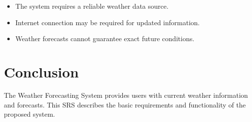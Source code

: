 \documentclass[12pt,a4paper]{article}
\begin{document}
\begin{itemize}
\item The system requires a reliable weather data source.
\item Internet connection may be required for updated information.
\item Weather forecasts cannot guarantee exact future conditions.
\end{itemize}

\section{Conclusion}

The Weather Forecasting System provides users with current weather
information and forecasts. This SRS describes the basic requirements
and functionality of the proposed system.
\end{document}
